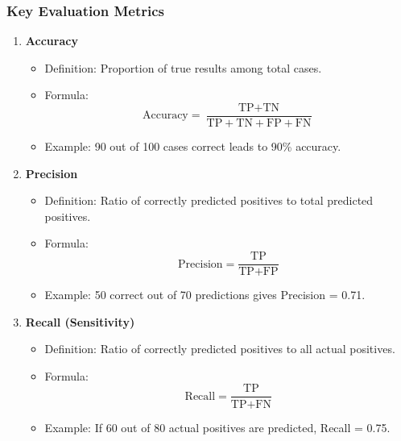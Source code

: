 \documentclass[aspectratio=169]{beamer}
\begin{document}
\begin{frame}
  \frametitle{Key Evaluation Metrics}
  \begin{enumerate}
    \item \textbf{Accuracy}
      \begin{itemize}
        \item Definition: Proportion of true results among total cases.
        \item Formula: 
          \begin{equation}
            \text{Accuracy} = \frac{\text{TP} + \text{TN}}{\text{TP} + \text{TN} + \text{FP} + \text{FN}}
          \end{equation}
        \item Example: 90 out of 100 cases correct leads to 90\% accuracy.
      \end{itemize}
      
    \item \textbf{Precision}
      \begin{itemize}
        \item Definition: Ratio of correctly predicted positives to total predicted positives.
        \item Formula: 
          \begin{equation}
            \text{Precision} = \frac{\text{TP}}{\text{TP} + \text{FP}}
          \end{equation}
        \item Example: 50 correct out of 70 predictions gives Precision = 0.71.
      \end{itemize}

    \item \textbf{Recall (Sensitivity)}
      \begin{itemize}
        \item Definition: Ratio of correctly predicted positives to all actual positives.
        \item Formula: 
          \begin{equation}
            \text{Recall} = \frac{\text{TP}}{\text{TP} + \text{FN}}
          \end{equation}
        \item Example: If 60 out of 80 actual positives are predicted, Recall = 0.75.
      \end{itemize}
  \end{enumerate}
\end{frame}
\end{document}
